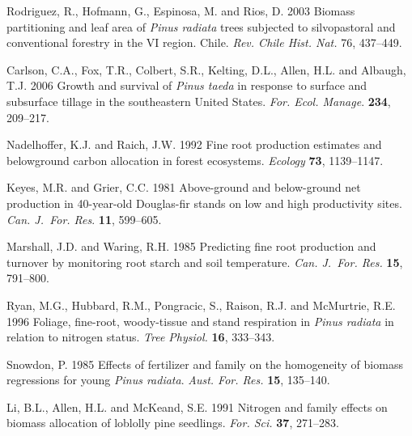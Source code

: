 \documentclass[final]{foresj}
\begin{document}
\begin{thebibliography}
Rodriguez, R., Hofmann, G., Espinosa, M. and Rios, D. 2003
Biomass partitioning and leaf area of \textit{Pinus
radiata} trees subjected to silvopastoral and conventional
forestry in the VI region. Chile. \textit{Rev. Chile Hist.
Nat.} 76, 437--449.\vspace*{-0.5pt}

Carlson, C.A., Fox, T.R., Colbert, S.R., Kelting, D.L.,
Allen, H.L. and Albaugh, T.J. 2006 Growth and survival of
\textit{Pinus taeda} in response to surface and subsurface
tillage in the southeastern United States. \textit{For.
Ecol. Manage}. \textbf{234}, 209--217.\vspace*{-0.5pt}

Nadelhoffer, K.J. and Raich, J.W. 1992 Fine root production
estimates and belowground carbon allocation in forest
ecosystems. \textit{Ecology} \textbf{73}, 1139--1147.\vspace*{-0.5pt}

Keyes, M.R. and Grier, C.C. 1981 Above-ground and
below-ground net production in 40-year-old Douglas-fir
stands on low and high productivity sites. \textit{Can.
J.~For. Res}. \textbf{11}, 599--605.\vspace*{-0.5pt}

Marshall, J.D. and Waring, R.H. 1985 Predicting fine root
production and turnover by monitoring root starch and soil
temperature. \textit{Can. J.~For. Res.} \textbf{15},
791--800.\vspace*{-0.5pt}

Ryan, M.G., Hubbard, R.M., Pongracic, S., Raison, R.J. and
McMurtrie, R.E. 1996 Foliage, fine-root, woody-tissue and
stand respiration in \textit{Pinus radiata} in relation to
nitrogen status. \textit{Tree Physiol.} \textbf{16},
333--343.\vspace*{-0.5pt}

Snowdon, P. 1985 Effects of fertilizer and family on the
homogeneity of biomass regressions for young \textit{Pinus
radiata}. \textit{Aust. For. Res.} \textbf{15}, 135--140.


Li, B.L., Allen, H.L. and McKeand, S.E. 1991 Nitrogen and
family effects on biomass allocation of loblolly pine
seedlings. \textit{For. Sci.} \textbf{37}, 271--283.


\end{thebibliography}
\end{document}
